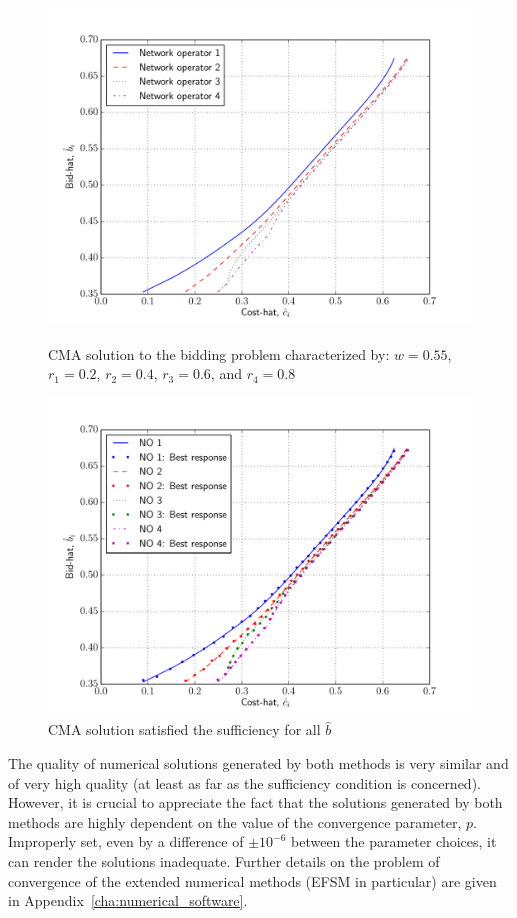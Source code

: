 \begin{figure}[p!]
  \includegraphics[width=\figsize]{Indirect/Figures/combined_4}
  \caption{CMA solution to the bidding problem characterized by: $w=0.55$, $r_1 = 0.2$, $r_2 = 0.4$, $r_3 = 0.6$, and $r_4 = 0.8$}
  \label{fig:combined_4_indirect}
  \vspace{10mm}
  \includegraphics[width=\figsize]{Indirect/Figures/combined_4_sufficiency}
  \caption{CMA solution satisfied the sufficiency for all $\hat{b}$}
  \label{fig:combined_4_sufficiency_indirect}
\end{figure}

The quality of numerical solutions generated by both methods is very similar and of very high quality (at least as far as the sufficiency condition is concerned). However, it is crucial to appreciate the fact that the solutions generated by both methods are highly dependent on the value of the convergence parameter, $p$. Improperly set, even by a difference of $\pm 10^{-6}$ between the parameter choices, it can render the solutions inadequate. Further details on the problem of convergence of the extended numerical methods (EFSM in particular) are given in Appendix~\ref{cha:numerical_software}.

